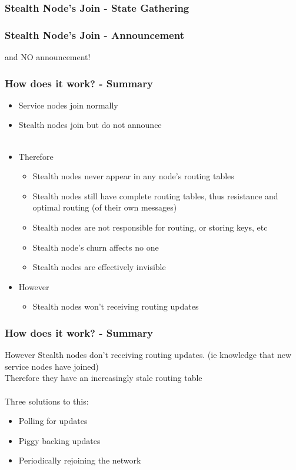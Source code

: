 \documentclass{beamer}
\begin{document}
\begin{frame}
  \frametitle{Stealth Node's Join - State Gathering}
  \begin{center}
  \end{center}
\end{frame}

\begin{frame}
  \frametitle{Stealth Node's Join - Announcement}
  \begin{center}
  \alert{and NO announcement!}
  \end{center}
\end{frame}

\begin{frame}
  \frametitle{How does it work? - Summary}
  \begin{itemize}

    \item Service nodes join normally
    \item Stealth nodes join but do not announce
    \\~\\
    \item Therefore
      \begin{itemize}
        \item Stealth nodes never appear in any node's routing tables
        \item Stealth nodes still have complete routing tables, thus resistance and optimal routing (of their own messages)
        \item Stealth nodes are not responsible for routing, or storing keys, etc
        \item Stealth node's churn affects no one
        \item Stealth nodes are effectively invisible
      \end{itemize}
    \item However
      \begin{itemize}
        \item Stealth nodes won't receiving routing updates
      \end{itemize}

  \end{itemize}
\end{frame}

\begin{frame}
  \frametitle{How does it work? - Summary}
  However Stealth nodes don't receiving routing updates. (ie knowledge that new service nodes have joined)\\
  Therefore they have an increasingly stale routing table \\
  ~\\
  Three solutions to this:
  \begin{itemize}
    \item Polling for updates
    \item Piggy backing updates
    \item Periodically rejoining the network
  \end{itemize}
\end{frame}
\end{document}
